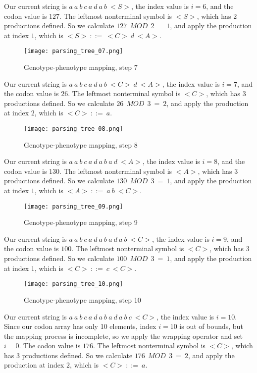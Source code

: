 Our current string is $a\:a\:b\:c\:a\:d\:a\:b\:{<}S{>}$, the index value is $i = 6$, and the codon value is $127$. The leftmost nonterminal symbol is ${<}S{>}$, which has $2$ productions defined. So we calculate $127\:\:MOD\:\:2\:=\:1$, and apply the production at index $1$, which is ${<}S{>}\:::=\:{<}C{>}\:d\:{<}A{>}$.

\begin{figure}[H]
	\centering
	\texttt{[image: parsing\_tree\_07.png]}
	\caption{Genotype-phenotype mapping, step 7}
\end{figure}

Our current string is $a\:a\:b\:c\:a\:d\:a\:b\:{<}C{>}\:d\:{<}A{>}$, the index value is $i = 7$, and the codon value is $26$. The leftmost nonterminal symbol is ${<}C{>}$, which has $3$ productions defined. So we calculate $26\:\:MOD\:\:3\:=\:2$, and apply the production at index $2$, which is ${<}C{>}\:::=\:a$.

\begin{figure}[H]
	\centering
	\texttt{[image: parsing\_tree\_08.png]}
	\caption{Genotype-phenotype mapping, step 8}
\end{figure}

Our current string is $a\:a\:b\:c\:a\:d\:a\:b\:a\:d\:{<}A{>}$, the index value is $i = 8$, and the codon value is $130$. The leftmost nonterminal symbol is ${<}A{>}$, which has $3$ productions defined. So we calculate $130\:\:MOD\:\:3\:=\:1$, and apply the production at index $1$, which is ${<}A{>}\:::=\:a\:b\:{<}C{>}$.

\begin{figure}[H]
	\centering
	\texttt{[image: parsing\_tree\_09.png]}
	\caption{Genotype-phenotype mapping, step 9}
\end{figure}

Our current string is $a\:a\:b\:c\:a\:d\:a\:b\:a\:d\:a\:b\:{<}C{>}$, the index value is $i = 9$, and the codon value is $100$. The leftmost nonterminal symbol is ${<}C{>}$, which has $3$ productions defined. So we calculate $100\:\:MOD\:\:3\:=\:1$, and apply the production at index $1$, which is ${<}C{>}\:::=\:c\:{<}C{>}$.

\begin{figure}[H]
	\centering
	\texttt{[image: parsing\_tree\_10.png]}
	\caption{Genotype-phenotype mapping, step 10}
\end{figure}

Our current string is $a\:a\:b\:c\:a\:d\:a\:b\:a\:d\:a\:b\:c\:{<}C{>}$, the index value is $i = 10$. Since our codon array has only 10 elements, index $i = 10$ is out of bounds, but the mapping process is incomplete, so we apply the wrapping operator and set $i = 0$. The codon value is $176$. The leftmost nonterminal symbol is ${<}C{>}$, which has $3$ productions defined. So we calculate $176\:\:MOD\:\:3\:=\:2$, and apply the production at index $2$, which is ${<}C{>}\:::=\:a$.

